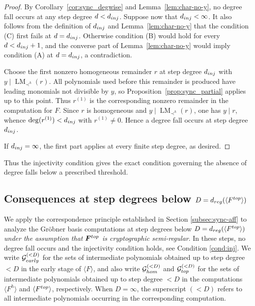 \documentclass{article}
\theoremstyle{definition}
\theoremstyle{plain}
\theoremstyle{plain}
\theoremstyle{plain}
\theoremstyle{plain}
\numberwithin{equation}{subsection}
\begin{document}
\begin{proof}
By Corollary~\ref{cor:sync_degwise} and Lemma~\ref{lem:char-no-y}, no degree fall occurs at any step degree $d<d_{\rm inj}$.
Suppose now that $d_{\rm inj}<\infty$.
It also follows from the definition of $d_{\rm inj}$ and Lemma~\ref{lem:char-no-y} that the condition {\rm (C)} first fails at $d=d_{\rm inj}$.
Otherwise condition {\rm (B)} would hold for every $d<d_{\rm inj}+1$, and the converse part of Lemma~\ref{lem:char-no-y} would imply condition {\rm (A)} at $d=d_{\rm inj}$, a contradiction.

Choose the first nonzero homogeneous remainder $r$ at step degree $d_{\rm inj}$ with $y\mid\operatorname{LM}_{\prec^h}(r)$.
All polynomials used before this remainder is produced have leading monomials not divisible by $y$, so Proposition~\ref{prop:sync_partial} applies up to this point.
Thus $r^{(1)}$ is the corresponding nonzero remainder in the computation for $F$.
Since $r$ is homogeneous and $y\mid\operatorname{LM}_{\prec^h}(r)$, one has $y\mid r$, whence $\deg(r^{(1)})<d_{\rm inj}$ with $r^{(1)}\neq 0$.
Hence a degree fall occurs at step degree $d_{\rm inj}$.

If $d_{\rm inj}=\infty$, the first part applies at every finite step degree, as desired.
\end{proof}

Thus the injectivity condition gives the exact condition governing the absence of degree falls below a prescribed threshold.

\subsection{Consequences at step degrees below $D=d_{\rm reg}(\langle F^{\rm top}\rangle)$}

We apply the correspondence principle established in Section \ref{subsec:sync-aff} to analyze the Gr\"obner basis computations at step degrees below $D=d_{\rm reg}(\langle F^{\rm top}\rangle)$ {\em under the assumption that $\bm{F}^{\rm top}$ is cryptographic semi-regular}. 
In these steps, no degree fall occurs and the injectivity condition holds, see Condition \ref{cond:inj}.
We write $\mathcal G_{\rm early}^{(<D)}$ for the sets of intermediate polynomials obtained up to step degree $<D$ in the early stage of $\langle F\rangle$, and also write $\mathcal G_{\rm hom}^{(<D)}$ and $\mathcal G_{\rm top}^{(<D)}$ for the sets of intermediate polynomials obtained up to step degree $<D$ in the computations $\langle F^h\rangle$ and $\langle F^{\rm top}\rangle$, respectively.
When $D=\infty$, the superscript $(<D)$ refers to all intermediate polynomials occurring in the corresponding computation.
\end{document}
